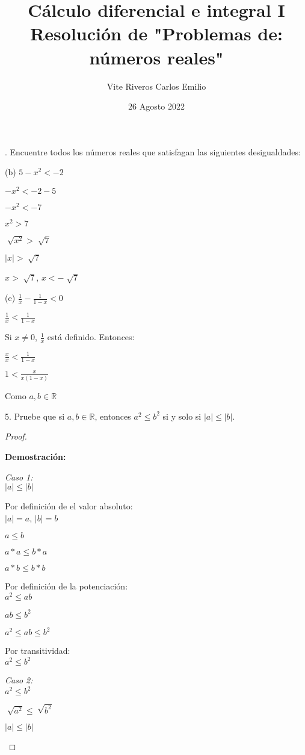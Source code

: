 \documentclass[12pt, a4paper]{article}
\title{Cálculo diferencial e integral I\\Resolución de "Problemas de: números reales"}
\author{Vite Riveros Carlos Emilio}
\date{26 Agosto 2022}
\begin{document}
    . Encuentre todos los números reales que satisfagan las siguientes desigualdades:
    \begin{center}
        (b) $5-x^2<-2$
            
            $-x^2<-2-5$

            $-x^2<-7$

            $x^2>7$

            $\sqrt[]{x^2}>\sqrt[]{7}$

            $|x|>\sqrt[]{7}$

            $x>\sqrt[]{7}$,  $x<-\sqrt[]{7}$
            
        (e) $\frac{1}{x} - \frac{1}{1-x} < 0$ 

            $\frac{1}{x} < \frac{1}{1-x} $

            Si $x \neq 0$, $\frac{1}{x}$ está definido. Entonces:

            $\frac{x}{x} < \frac{1}{1-x}$

            $1 < \frac{x}{x(1-x)}$

            Como $a,b \in \mathbb{R}$

    \end{center}

    5. Pruebe que si $a,b \in \mathbb{R}$, entonces $a^2 \leq b^2$ si y solo si $|a| \leq |b|$.
        \begin{proof}
            \begin{center}
                \textbf{Demostración:}

                \textit{Caso 1:}\\
                $|a|\leq|b|$

                Por definición de el valor absoluto:\\
                $|a|=a$, $|b|=b$

                $a \leq b$

                $a * a \leq b * a$ 
                
                $a * b \leq b * b$

                Por definición de la potenciación:\\

                $a^2 \leq ab$
                
                $ab \leq b^2$

                $a^2 \leq ab \leq b^2 $

                Por transitividad:\\
                $a^2 \leq b^2$

                \textit{Caso 2:}\\
                $a^2 \leq b^2$

                $\sqrt[]{a^2} \leq \sqrt[]{b^2}$

                $|a|\leq|b|$

            \end{center}       
        \end{proof}
\end{document}
